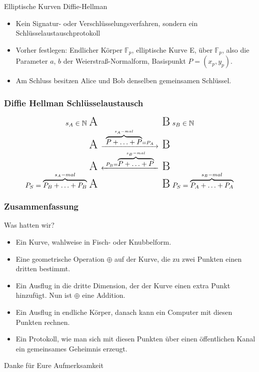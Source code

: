 \documentclass{beamer}
\newcommand{\F}{\mathbb{F}}
\newcommand{\N}{\mathbb{N}}
\begin{document}
\begin{frame}
  Elliptische Kurven Diffie-Hellman
  \begin{itemize}
  \item Kein Signatur- oder Verschlüsselungsverfahren, sondern ein
    Schlüsselaustauschprotokoll
  \item Vorher festlegen: Endlicher Körper $\F_p$, elliptische Kurve E, über
    $\F_p$, also die Parameter $a$, $b$ der Weierstraß-Normalform, Basispunkt
    $P = (x_p, y_p)$.
  \item Am Schluss besitzen Alice und Bob denselben gemeinsamen Schlüssel.
  \end{itemize}
\end{frame}

\begin{frame}
  \frametitle{Diffie Hellman Schlüsselaustausch}
  \begin{equation*}
    \begin{CD}
      {\hbox to 0pt{\hss $s_A \in \N$ }}\text{\LARGE A}
      @. \text
      {\LARGE B}{\hbox to 0pt{ $s_B \in \N$\hss}} \\
      \text{\LARGE A}
      @>\ \overbrace{P + \ldots + P}^{s_A-mal} = P_A\ >>
      \text{\LARGE B} \\
      \text{\LARGE A}
      @<\ P_B = \overbrace{P + \ldots + P}^{s_B-mal}\ <<
      \text{\LARGE B} \\
      {\hbox to 0pt{\hss $P_S = \overbrace{P_B + \ldots + P_B}^{s_A-mal}$ }}
      \text{\LARGE A}
      @.
      \text{\LARGE B}
      {\hbox to 0pt{ $P_S = \overbrace{P_A + \ldots + P_A}^{s_B-mal}$\hss}}
    \end{CD}
  \end{equation*}
\end{frame}

\begin{frame}
  \frametitle{Zusammenfassung}
  \vspace*{-1cm}
  Was hatten wir?
  \begin{itemize}
  \item Ein Kurve, wahlweise in Fisch- oder Knubbelform.
  \item Eine geometrische Operation $\oplus$ auf der Kurve, die zu zwei
    Punkten einen dritten bestimmt.
  \item Ein Ausflug in die dritte Dimension, der der Kurve einen extra Punkt
    hinzufügt. Nun ist $\oplus$ eine Addition.
  \item Ein Ausflug in endliche Körper, danach kann ein Computer mit diesen
    Punkten rechnen.
  \item Ein Protokoll, wie man sich mit diesen Punkten über einen öffentlichen
    Kanal ein gemeinsames Geheimnis erzeugt.
  \end{itemize}
\end{frame}

\begin{frame}
  \begin{center}
    \Large Danke für Eure Aufmerksamkeit
  \end{center}
\end{frame}
\end{document}
